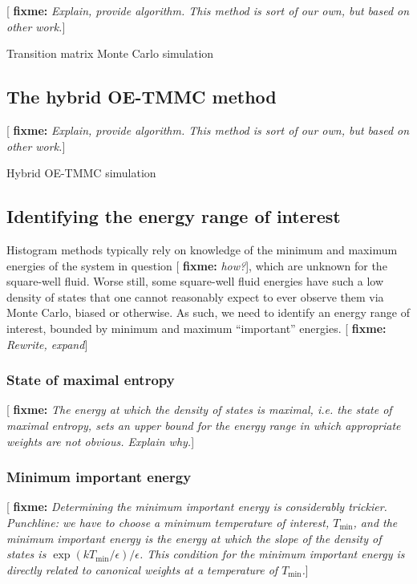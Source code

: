 \documentclass[11pt]{article}
\renewcommand{\t}{\text} %
\newcommand{\p}[1]{\left(#1\right)} %
\newcommand{\red}[1]{{\bf \color{red} #1}}
\newcommand{\fixme}[1]{[\red{fixme:} \emph{#1}]}
\begin{document}
\fixme{Explain, provide algorithm. This method is sort of our own, but
  based on other work.}

\begin{algorithm}[H]
  \caption{Transition matrix Monte Carlo simulation}
  \label{alg:tmmc}
\end{algorithm}


\subsection{The hybrid OE-TMMC method}
\label{sec:oetmmc}

\fixme{Explain, provide algorithm. This method is sort of our own, but
  based on other work.}

\begin{algorithm}[H]
  \caption{Hybrid OE-TMMC simulation}
  \label{alg:oetmmc}
\end{algorithm}


\subsection{Identifying the energy range of interest}
\label{sec:energy_range}

Histogram methods typically rely on knowledge of the minimum and
maximum energies of the system in question \fixme{how?}, which are
unknown for the square-well fluid. Worse still, some square-well fluid
energies have such a low density of states that one cannot reasonably
expect to ever observe them via Monte Carlo, biased or otherwise. As
such, we need to identify an energy range of interest, bounded by
minimum and maximum ``important'' energies. \fixme{Rewrite, expand}

\subsubsection{State of maximal entropy}
\label{sec:max_entropy}

\fixme{The energy at which the density of states is maximal, i.e. the
  state of maximal entropy, sets an upper bound for the energy range
  in which appropriate weights are not obvious. Explain why.}

\subsubsection{Minimum important energy}
\label{sec:min_energy}

\fixme{Determining the minimum important energy is considerably
  trickier. Punchline: we have to choose a minimum temperature of
  interest, $T_{\t{min}}$, and the minimum important energy is the
  energy at which the slope of the density of states is
  $\exp\p{kT_{\t{min}}/\epsilon}/\epsilon$. This condition for the
  minimum important energy is directly related to canonical weights at
  a temperature of $T_{\t{min}}$.}
\end{document}
